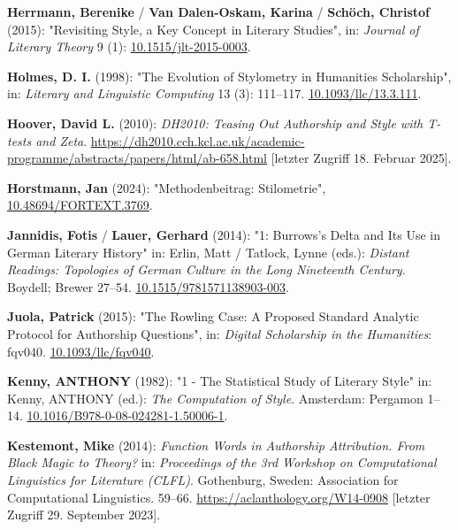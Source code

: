 \documentclass[
  12pt,
  letterpaper,
]{classicthesis}
\newlength{\cslhangindent}
\newenvironment{CSLReferences}[2] %
 {\begin{list}{}{%
  \setlength{\itemindent}{0pt}
  \setlength{\leftmargin}{0pt}
  \setlength{\parsep}{0pt}
  \ifodd #1
   \setlength{\leftmargin}{\cslhangindent}
   \setlength{\itemindent}{-1\cslhangindent}
  \fi
  \setlength{\itemsep}{#2\baselineskip}}}
 {\end{list}}
\begin{document}
\begin{CSLReferences}{1}{0}
\textbf{Herrmann, Berenike} / \textbf{Van Dalen-Oskam, Karina} /
\textbf{Schöch, Christof} (2015): "Revisiting {Style}, a {Key} {Concept}
in {Literary} {Studies}", in: \emph{Journal of Literary Theory} 9 (1):
\href{https://doi.org/10.1515/jlt-2015-0003}{10.1515/jlt-2015-0003}.

\textbf{Holmes, D. I.} (1998): "The {Evolution} of {Stylometry} in
{Humanities} {Scholarship}", in: \emph{Literary and Linguistic
Computing} 13 (3): 111--117.
\href{https://doi.org/10.1093/llc/13.3.111}{10.1093/llc/13.3.111}.

\textbf{Hoover, David L.} (2010): \emph{{DH2010}: {Teasing} {Out}
{Authorship} and {Style} with {T}-tests and {Zeta}}.
\url{https://dh2010.cch.kcl.ac.uk/academic-programme/abstracts/papers/html/ab-658.html}
{[}letzter Zugriff 18. Februar 2025{]}.

\textbf{Horstmann, Jan} (2024): "Methodenbeitrag: {Stilometrie}",
\href{https://doi.org/10.48694/FORTEXT.3769}{10.48694/FORTEXT.3769}.

\textbf{Jannidis, Fotis} / \textbf{Lauer, Gerhard} (2014): "1:
{Burrows}'s {Delta} and {Its} {Use} in {German} {Literary} {History}"
in: Erlin, Matt / Tatlock, Lynne (eds.): \emph{Distant {Readings}:
{Topologies} of {German} {Culture} in the {Long} {Nineteenth}
{Century}}. Boydell; Brewer 27--54.
\href{https://doi.org/10.1515/9781571138903-003}{10.1515/9781571138903-003}.

\textbf{Juola, Patrick} (2015): "The {Rowling} {Case}: {A} {Proposed}
{Standard} {Analytic} {Protocol} for {Authorship} {Questions}", in:
\emph{Digital Scholarship in the Humanities}: fqv040.
\href{https://doi.org/10.1093/llc/fqv040}{10.1093/llc/fqv040}.

\textbf{Kenny, ANTHONY} (1982): "1 - {The} {Statistical} {Study} of
{Literary} {Style}" in: Kenny, ANTHONY (ed.): \emph{The {Computation} of
{Style}}. Amsterdam: Pergamon 1--14.
\href{https://doi.org/10.1016/B978-0-08-024281-1.50006-1}{10.1016/B978-0-08-024281-1.50006-1}.

\textbf{Kestemont, Mike} (2014): \emph{Function {Words} in {Authorship}
{Attribution}. {From} {Black} {Magic} to {Theory}?} in:
\emph{Proceedings of the 3rd {Workshop} on {Computational} {Linguistics}
for {Literature} ({CLFL})}. Gothenburg, Sweden: Association for
Computational Linguistics. 59--66.
\url{https://aclanthology.org/W14-0908} {[}letzter Zugriff 29. September
2023{]}.


\end{CSLReferences}
\end{document}

